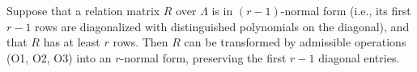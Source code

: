 Suppose that a relation matrix $R$ over $\Lambda$ is in $(r-1)$-normal form (i.e., its first $r-1$ rows are diagonalized with distinguished polynomials on the diagonal), and that $R$ has at least $r$ rows. Then $R$ can be transformed by admissible operations (O1, O2, O3) into an $r$-normal form, preserving the first $r-1$ diagonal entries.
